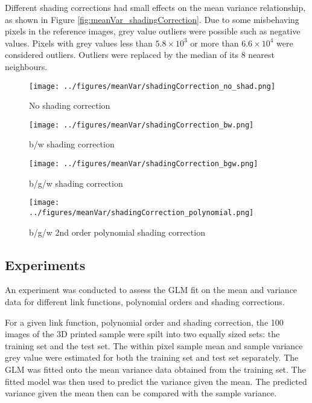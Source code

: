 \documentclass[a4paper]{proc}
\begin{document}
Different shading corrections had small effects on the mean variance relationship, as shown in Figure \ref{fig:meanVar_shadingCorrection}. Due to some misbehaving pixels in the reference images, grey value outliers were possible such as negative values. Pixels with grey values less than $5.8\times 10^3$ or more than $6.6\times 10^4$ were considered outliers. Outliers were replaced by the median of its 8 nearest neighbours.

\begin{figure*}
	\centering
	\begin{subfigure}{0.45\textwidth}
		\centering
		\texttt{[image: ../figures/meanVar/shadingCorrection\_no\_shad.png]}
		\caption{No shading correction}
	\end{subfigure}
	\begin{subfigure}{0.45\textwidth}
		\centering
		\texttt{[image: ../figures/meanVar/shadingCorrection\_bw.png]}
		\caption{b/w shading correction}
	\end{subfigure}
	\begin{subfigure}{0.45\textwidth}
		\centering
		\texttt{[image: ../figures/meanVar/shadingCorrection\_bgw.png]}
		\caption{b/g/w shading correction}
	\end{subfigure}
	\begin{subfigure}{0.45\textwidth}
		\centering
		\texttt{[image: ../figures/meanVar/shadingCorrection\_polynomial.png]}
		\caption{b/g/w 2nd order polynomial shading correction}
	\end{subfigure}
	\caption{Post shading correction within pixel mean and variance grey value frequency density plot of each pixel in the segmented image of the 3D printed sample. A Gamma GLM was fitted with the identity link. The solid and dotted lines are the mean response and the $\Phi(\pm 1)$ quantiles respectively.}
	\label{fig:meanVar_shadingCorrection}
\end{figure*}

\subsection{Experiments}

An experiment was conducted to assess the GLM fit on the mean and variance data for different link functions, polynomial orders and shading corrections.

For a given link function, polynomial order and shading correction, the 100 images of the 3D printed sample were spilt into two equally sized sets: the training set and the test set. The within pixel sample mean and sample variance grey value were estimated for both the training set and test set separately. The GLM was fitted onto the mean variance data obtained from the training set. The fitted model was then used to predict the variance given the mean. The predicted variance given the mean then can be compared with the sample variance.
\end{document}

